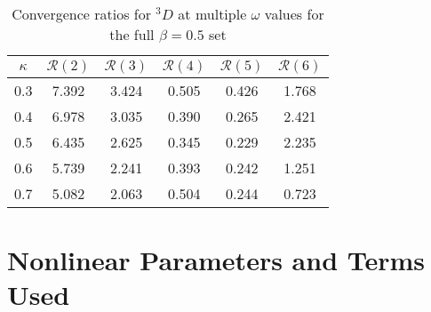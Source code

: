 \documentclass[Dissertation.tex]{subfiles}
\begin{document}
\begin{table}
\centering
\begin{tabular}{cccccc}
\toprule
$\kappa$ & $\mathcal{R}(2)$ & $\mathcal{R}(3)$ & $\mathcal{R}(4)$ & $\mathcal{R}(5)$ & $\mathcal{R}(6)$ \\
\midrule
0.3 & 7.392 & 3.424 & 0.505 & 0.426 & 1.768 \\
0.4 & 6.978 & 3.035 & 0.390 & 0.265 & 2.421 \\
0.5 & 6.435 & 2.625 & 0.345 & 0.229 & 2.235 \\
0.6 & 5.739 & 2.241 & 0.393 & 0.242 & 1.251 \\
0.7 & 5.082 & 2.063 & 0.504 & 0.244 & 0.723 \\
\bottomrule
\end{tabular}
\caption{Convergence ratios for $^3D$ at multiple $\omega$ values for the full $\beta = 0.5$ set}
\label{tab:D3Beta5VarConv}
\end{table}


\section{Nonlinear Parameters and Terms Used}
\label{sec:NonlinParam}
\end{document}
